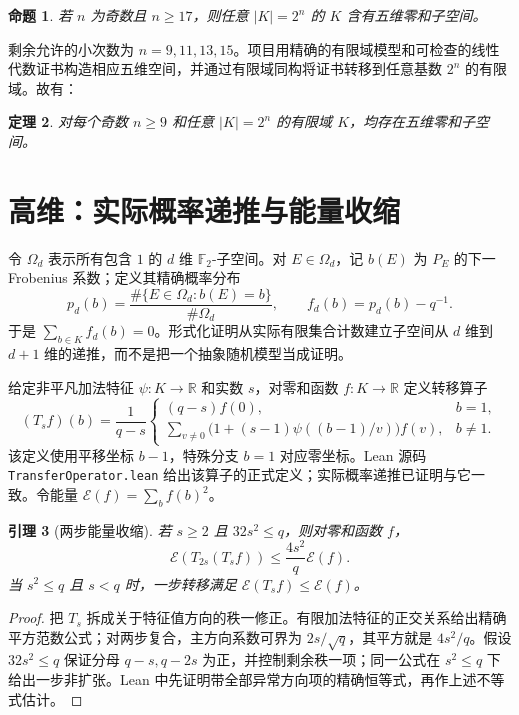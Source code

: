 \documentclass[UTF8,a4paper,11pt]{ctexart}
\numberwithin{equation}{section}
\newtheorem{theorem}{定理}[section]
\newtheorem{lemma}[theorem]{引理}
\newtheorem{proposition}[theorem]{命题}
\theoremstyle{definition}
\theoremstyle{remark}
\newcommand{\Ftwo}{\mathbb F_2}
\begin{document}
\begin{proposition}\label{prop:k5large}
若 $n$ 为奇数且 $n\ge17$，则任意 $|K|=2^n$ 的 $K$ 含有五维零和子空间。
\end{proposition}

剩余允许的小次数为 $n=9,11,13,15$。项目用精确的有限域模型和可检查的线性代数证书构造相应五维空间，并通过有限域同构将证书转移到任意基数 $2^n$ 的有限域。故有：
\begin{theorem}\label{thm:k5}
对每个奇数 $n\ge9$ 和任意 $|K|=2^n$ 的有限域 $K$，均存在五维零和子空间。
\end{theorem}

\section{高维：实际概率递推与能量收缩}

令 $\Omega_d$ 表示所有包含 $1$ 的 $d$ 维 $\Ftwo$-子空间。对 $E\in\Omega_d$，记 $b(E)$ 为 $P_E$ 的下一 Frobenius 系数；定义其精确概率分布
\[
 p_d(b)=\frac{\#\{E\in\Omega_d:b(E)=b\}}{\#\Omega_d},\qquad
 f_d(b)=p_d(b)-q^{-1}.
\]
于是 $\sum_{b\in K}f_d(b)=0$。形式化证明从实际有限集合计数建立子空间从 $d$ 维到 $d+1$ 维的递推，而不是把一个抽象随机模型当成证明。

给定非平凡加法特征 $\psi:K\to\mathbb R$ 和实数 $s$，对零和函数 $f:K\to\mathbb R$ 定义转移算子
\[
 (T_sf)(b)=\frac{1}{q-s}\begin{cases}
 (q-s)f(0),&b=1,\\[2pt]
 \displaystyle\sum_{v\ne0}\bigl(1+(s-1)\psi((b-1)/v)\bigr)f(v),&b\ne1.
 \end{cases}
\]
该定义使用平移坐标 $b-1$，特殊分支 $b=1$ 对应零坐标。Lean 源码 \texttt{TransferOperator.lean} 给出该算子的正式定义；实际概率递推已证明与它一致。令能量 $\mathcal E(f)=\sum_b f(b)^2$。

\begin{lemma}[两步能量收缩]\label{lem:energy}
若 $s\ge2$ 且 $32s^2\le q$，则对零和函数 $f$，
\[
 \mathcal E(T_{2s}(T_sf))\le\frac{4s^2}{q}\mathcal E(f).
\]
当 $s^2\le q$ 且 $s<q$ 时，一步转移满足 $\mathcal E(T_sf)\le\mathcal E(f)$。
\end{lemma}
\begin{proof}
把 $T_s$ 拆成关于特征值方向的秩一修正。有限加法特征的正交关系给出精确平方范数公式；对两步复合，主方向系数可界为 $2s/\sqrt q$，其平方就是 $4s^2/q$。假设 $32s^2\le q$ 保证分母 $q-s,q-2s$ 为正，并控制剩余秩一项；同一公式在 $s^2\le q$ 下给出一步非扩张。Lean 中先证明带全部异常方向项的精确恒等式，再作上述不等式估计。
\end{proof}
\end{document}
